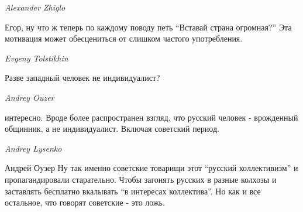 \emph{Alexander Zhiglo}

Егор, ну что ж теперь по каждому поводу петь \enquote{Вставай страна огромная?} Эта
мотивация может обесцениться от слишком частого употребления.

\emph{Evgeny Tolstikhin}

Разве западный человек не индивидуалист?

\emph{Andrey Ouzer}

интересно. Вроде более распространен взгляд, что русский человек - врожденный
общинник, а не индивидуалист. Включая советский период.

\emph{Andrey Lysenko}

Андрей Оузер Ну так именно советские товарищи этот \enquote{русский коллективизм} и
пропагандировали старательно. Чтобы загонять русских в разные колхозы и
заставлять бесплатно вкалывать \enquote{в интересах коллектива}. Но как и все
остальное, что говорят советские - это ложь.
